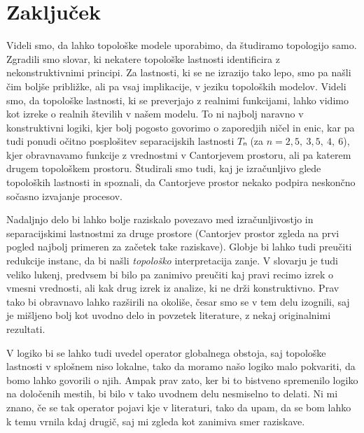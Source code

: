 \section{Zaključek}

Videli smo, da lahko topološke modele uporabimo, da študiramo topologijo samo.
Zgradili smo slovar, ki nekatere topološke lastnosti identificira z
nekonstruktivnimi principi. Za lastnosti, ki se ne izrazijo tako lepo, smo pa
našli čim boljše približke, ali pa vsaj implikacije, v jeziku topoloških
modelov. Videli smo, da topološke lastnosti, ki se preverjajo z realnimi
funkcijami, lahko vidimo kot izreke o realnih številih v našem modelu. To ni
najbolj naravno v konstruktivni logiki, kjer bolj pogosto govorimo o zaporedjih
ničel in enic, kar pa tudi ponudi očitno posplošitev separacijskih lastnosti \(Tₙ\)
(za \(n = 2,5,~3,5,~4,~6\)), kjer obravnavamo funkcije z vrednostmi v Cantorjevem
prostoru, ali pa katerem drugem topološkem prostoru. Študirali smo tudi, kaj je
izračunljivo glede topoloških lastnosti in spoznali, da Cantorjeve prostor nekako
podpira neskončno sočasno izvajanje procesov.

Nadaljnjo delo bi lahko bolje raziskalo povezavo med izračunljivostjo in
separacijskimi lastnostmi za druge prostore (Cantorjev prostor zgleda na prvi
pogled najbolj primeren za začetek take raziskave). Globje bi lahko tudi
preučiti redukcije instanc, da bi našli \emph{topološko} interpretacija zanje. V
slovarju je tudi veliko lukenj, predvsem bi bilo pa zanimivo preučiti kaj pravi
recimo izrek o vmesni vrednosti, ali kak drug izrek iz analize, ki ne drži
konstruktivno. Prav tako bi obravnavo lahko razširili na okoliše, česar smo se v
tem delu izognili, saj je mišljeno bolj kot uvodno delo in povzetek literature,
z nekaj originalnimi rezultati.

V logiko bi se lahko tudi uvedel operator globalnega obstoja, saj topološke
lastnosti v splošnem niso lokalne, tako da moramo našo logiko malo pokvariti, da
bomo lahko govorili o njih. Ampak prav zato, ker bi to bistveno spremenilo logiko
na določenih mestih, bi bilo v tako uvodnem delu nesmiselno to delati. Ni mi
znano, če se tak operator pojavi kje v literaturi, tako da upam, da se bom lahko
k temu vrnila kdaj drugič, saj mi zgleda kot zanimiva smer raziskave.



